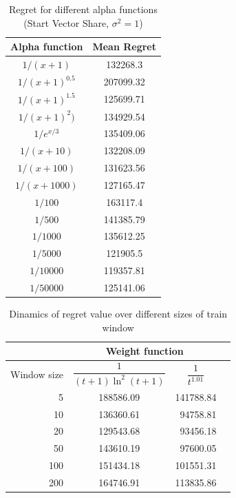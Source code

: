 \documentclass[12pt, twoside]{article}
\begin{document}
\begin{table}[H]
\centering
\caption{Regret for different alpha functions (Start Vector Share, $\sigma^2=1$)}
\label{tab:alpha}
\begin{tabular}{cc}
\toprule
Alpha function & Mean Regret \\
\midrule
$1 / (x + 1)$ & 132268.3 \\
$1 / (x + 1)^{0.5}$ & 207099.32 \\
$1 / (x + 1)^{1.5}$ & 125699.71 \\
$1 / (x + 1)^2)$ & 134929.54 \\
$1 / e^{x/3}$ & 135409.06 \\
$1 / (x + 10)$ & 132208.09 \\
$1 / (x + 100)$ & 131623.56 \\
$1 / (x + 1000)$ & 127165.47 \\
$1 / 100$ & 163117.4 \\
$1 / 500$ & 141385.79 \\
$1 / 1000$ & 135612.25 \\
$1 / 5000$ & 121905.5 \\
$1 / 10000$ & 119357.81 \\
$1 / 50000$ & 125141.06 \\
\bottomrule
\end{tabular}
\end{table}







\begin{table}[h]
\centering
\begin{tabular}{r|ccc}
 &
\multicolumn{2}{c}{Weight function} \\
\toprule {Window size}  &

\centering $\dfrac{1}{(t+1)\ln^2(t+1)}$ &
\centering $\dfrac1{t^{1.01}}$  & \tabularnewline

\midrule
5 &  188586.09 & 141788.84 \\ %
10 &  136360.61 &\ 94758.81 \\ %
20 &  129543.68 &\ 93456.18 \\ %
50 &  143610.19 &\ 97600.05 \\ %
100 & 151434.18 & 101551.31 \\ %
200 & 164746.91 & 113835.86 \\ %
\bottomrule
\end{tabular}
\caption{Dinamics of regret value over different sizes of train window} \hspace{16cm}

\end{table}
\end{document}
